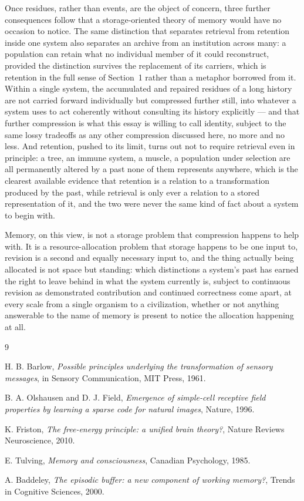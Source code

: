 \documentclass[11pt]{amsart}
\theoremstyle{plain}
\theoremstyle{definition}
\theoremstyle{remark}
\begin{document}
Once residues, rather than events, are the object of concern, three
further consequences follow that a storage-oriented theory of memory
would have no occasion to notice. The same distinction that separates
retrieval from retention inside one system also separates an archive
from an institution across many: a population can retain what no
individual member of it could reconstruct, provided the distinction
survives the replacement of its carriers, which is retention in the
full sense of Section~1 rather than a metaphor borrowed from it. Within
a single system, the accumulated and repaired residues of a long
history are not carried forward individually but compressed further
still, into whatever a system uses to act coherently without consulting
its history explicitly --- and that further compression is what this
essay is willing to call identity, subject to the same lossy tradeoffs
as any other compression discussed here, no more and no less. And
retention, pushed to its limit, turns out not to require retrieval even
in principle: a tree, an immune system, a muscle, a population under
selection are all permanently altered by a past none of them represents
anywhere, which is the clearest available evidence that retention is a
relation to a transformation produced by the past, while retrieval is
only ever a relation to a stored representation of it, and the two
were never the same kind of fact about a system to begin with.

Memory, on this view, is not a storage problem that compression happens
to help with. It is a resource-allocation problem that storage happens
to be one input to, revision is a second and equally necessary input
to, and the thing actually being allocated is not space but standing:
which distinctions a system's past has earned the right to leave behind
in what the system currently is, subject to continuous revision as
demonstrated contribution and continued correctness come apart, at
every scale from a single organism to a civilization, whether or not
anything answerable to the name of memory is present to notice the
allocation happening at all.

\bigskip
\begin{thebibliography}{9}

H. B. Barlow, \emph{Possible principles underlying the transformation
of sensory messages}, in Sensory Communication, MIT Press, 1961.

B. A. Olshausen and D. J. Field, \emph{Emergence of simple-cell
receptive field properties by learning a sparse code for natural
images}, Nature, 1996.

K. Friston, \emph{The free-energy principle: a unified brain theory?},
Nature Reviews Neuroscience, 2010.

E. Tulving, \emph{Memory and consciousness}, Canadian Psychology, 1985.

A. Baddeley, \emph{The episodic buffer: a new component of working
memory?}, Trends in Cognitive Sciences, 2000.

\end{thebibliography}
\end{document}
